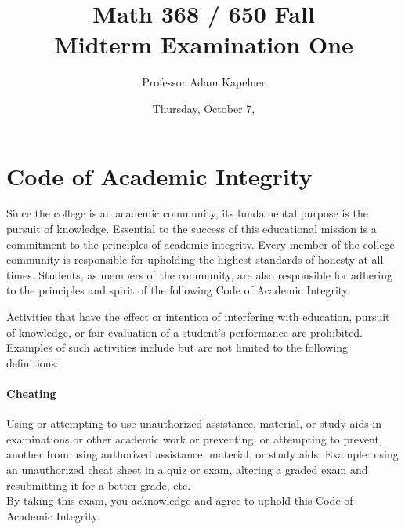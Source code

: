 \documentclass[12pt,landscape]{article}
\title{Math 368 / 650 Fall \the\year{} \\ Midterm Examination One}
\author{Professor Adam Kapelner}
\date{Thursday, October 7, \the\year{}}
\begin{document}
\maketitle


\thispagestyle{empty}

\section*{Code of Academic Integrity}

\footnotesize
Since the college is an academic community, its fundamental purpose is the pursuit of knowledge. Essential to the success of this educational mission is a commitment to the principles of academic integrity. Every member of the college community is responsible for upholding the highest standards of honesty at all times. Students, as members of the community, are also responsible for adhering to the principles and spirit of the following Code of Academic Integrity.

Activities that have the effect or intention of interfering with education, pursuit of knowledge, or fair evaluation of a student's performance are prohibited. Examples of such activities include but are not limited to the following definitions:

\paragraph{Cheating} Using or attempting to use unauthorized assistance, material, or study aids in examinations or other academic work or preventing, or attempting to prevent, another from using authorized assistance, material, or study aids. Example: using an unauthorized cheat sheet in a quiz or exam, altering a graded exam and resubmitting it for a better grade, etc.
\\

\noindent By taking this exam, you acknowledge and agree to uphold this Code of Academic Integrity. \\


\normalsize
\end{document}
